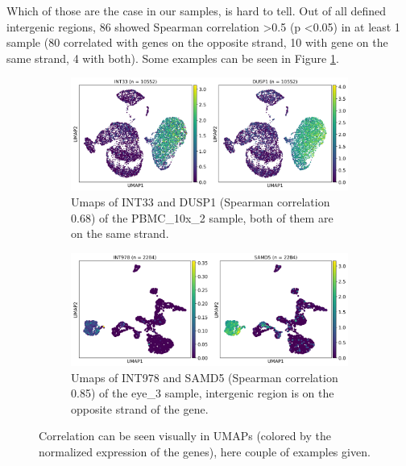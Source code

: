 Which of those are the case in our samples, is hard to tell.
Out of all defined intergenic regions, 86 showed Spearman correlation \textgreater 0.5 (p \textless 0.05) in at least 1 sample
(80 correlated with genes on the opposite strand, 10 with gene on the same strand, 4 with both).
Some examples can be seen in Figure \ref{fig:correlationUmaps}.

\begin{figure}[htbp]
    \centering
    \begin{subfigure}{\textwidth}
        \centering
        \includegraphics[width=\textwidth]{images/correlationUmaps/PBMC_10x_2_DUSP1.png}
        \caption{Umaps of INT33 and DUSP1 (Spearman correlation 0.68) of the PBMC\_10x\_2 sample, both of them are on the same strand.}
    \end{subfigure}
    \vspace{0.5em}
    \begin{subfigure}{\textwidth}
        \centering
        \includegraphics[width=\textwidth]{images/correlationUmaps/eye_3_SAMD5.png}
        \caption{Umaps of INT978 and SAMD5 (Spearman correlation 0.85) of the eye\_3 sample,
        intergenic region is on the opposite strand of the gene.}
    \end{subfigure}
    \caption{Correlation can be seen visually in UMAPs (colored by the normalized expression of the genes), here couple of examples given.}
    \label{fig:correlationUmaps}
\end{figure}





